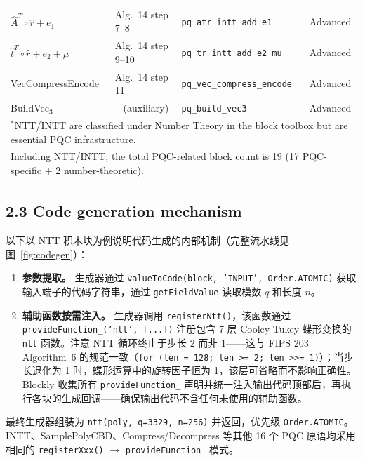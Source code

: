 \documentclass[preprint,12pt,a4paper]{elsarticle}
\begin{document}
\begin{table}[htbp]
\begin{tabular}{|l|l|l|l|}
		$\hat{A}^T\!\circ\!\hat{r}+e_1$     & Alg.~14 step 7--8      & \texttt{pq\_atr\_intt\_add\_e1}    & Advanced                                    \\
		$\hat{t}^T\!\circ\!\hat{r}+e_2+\mu$ & Alg.~14 step 9--10     & \texttt{pq\_tr\_intt\_add\_e2\_mu} & Advanced                                    \\
		VecCompressEncode                   & Alg.~14 step 11        & \texttt{pq\_vec\_compress\_encode} & Advanced                                    \\
		BuildVec$_3$                        & -- (auxiliary)         & \texttt{pq\_build\_vec3}           & Advanced                                    \\
		\hline
		\multicolumn{4}{l}{\footnotesize $^\ast$NTT/INTT are classified under Number Theory in the block toolbox but are essential PQC infrastructure.} \\
		\multicolumn{4}{l}{\footnotesize Including NTT/INTT, the total PQC-related block count is 19 (17 PQC-specific + 2 number-theoretic).}           \\
	\end{tabular}
\end{table}

\subsection*{2.3 Code generation mechanism}

以下以 NTT 积木块为例说明代码生成的内部机制（完整流水线见图~\ref{fig:codegen}）：

\begin{enumerate}
	\item \textbf{参数提取。} 生成器通过 \texttt{valueToCode(block, 'INPUT', Order.ATOMIC)} 获取输入端子的代码字符串，通过 \texttt{getFieldValue} 读取模数 $q$ 和长度 $n$。
	\item \textbf{辅助函数按需注入。} 生成器调用 \texttt{registerNtt()}，该函数通过 \texttt{provideFunction\_('ntt', [...])} 注册包含 7 层 Cooley-Tukey 蝶形变换的 \texttt{ntt} 函数。注意 NTT 循环终止于步长 2 而非 1——这与 FIPS 203 Algorithm~6 的规范一致（\texttt{for (len = 128; len >= 2; len >>= 1)}）；当步长退化为 1 时，蝶形运算中的旋转因子恒为 1，该层可省略而不影响正确性。Blockly 收集所有 \texttt{provideFunction\_} 声明并统一注入输出代码顶部后，再执行各块的生成回调——确保输出代码不含任何未使用的辅助函数。
\end{enumerate}

最终生成器组装为 \texttt{ntt(poly, q=3329, n=256)} 并返回，优先级 \texttt{Order.ATOMIC}。INTT、SamplePolyCBD、Compress/Decompress 等其他 16 个 PQC 原语均采用相同的 \texttt{registerXxx()} $\rightarrow$ \texttt{provideFunction\_} 模式。
\end{document}
